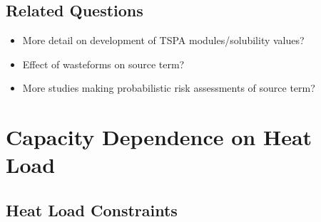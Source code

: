 \subsection{Related Questions}
\begin{itemize}
\item{} More detail on development of TSPA modules/solubility values?
\item{} Effect of wasteforms on source term? 
\item{} More studies making probabilistic risk assessments of source term?
\end{itemize}

\section{Capacity Dependence on Heat Load}
\subsection{Heat Load Constraints}

